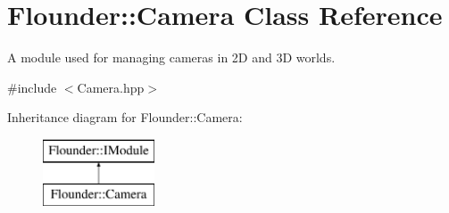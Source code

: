 \hypertarget{class_flounder_1_1_camera}{}\section{Flounder\+:\+:Camera Class Reference}
\label{class_flounder_1_1_camera}


A module used for managing cameras in 2D and 3D worlds.  




{\ttfamily \#include $<$Camera.\+hpp$>$}

Inheritance diagram for Flounder\+:\+:Camera\+:\begin{figure}[H]
\begin{center}
\leavevmode
\includegraphics[height=2.000000cm]{class_flounder_1_1_camera}
\end{center}
\end{figure}
